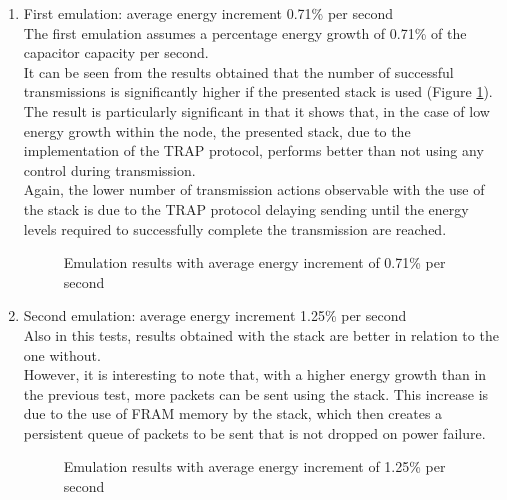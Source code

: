 \begin{enumerate}
\item First emulation: average energy increment 0.71\% per second\\
The first emulation assumes a percentage energy growth of 0.71\% of the capacitor capacity per second.\\
It can be seen from the results obtained that the number of successful transmissions is significantly higher if the presented stack is used (Figure \ref{fig:SGFT0}).\\
The result is particularly significant in that it shows that, in the case of low energy growth within the node, the presented stack, due to the implementation of the TRAP protocol, performs better than not using any control during transmission.\\
Again, the lower number of transmission actions observable with the use of the stack is due to the TRAP protocol delaying sending until the energy levels required to successfully complete the transmission are reached.
\begin{figure}[H]
\centerline{}
\caption{\footnotesize \centering Emulation results with average energy increment of 0.71\% per second}
\label{fig:SGFT0}
\end{figure}
\begin{comment}
\begin{figure}[H]
\centerline{\psfig{file=Images/7560071RATIO.png,width=0.7\textwidth}}
\caption{\footnotesize \centering Success ratio of transmission with average energy increment of 0.71\% per second}
\label{fig:SGFT1}
\end{figure}
\end{comment}
\item Second emulation: average energy increment 1.25\% per second\\
Also in this tests, results obtained with the stack are better in relation to the one without.\\
However, it is interesting to note that, with a higher energy growth than in the previous test, more packets can be sent using the stack. This increase is due to the use of FRAM memory by the stack, which then creates a persistent queue of packets to be sent that is not dropped on power failure.
\begin{figure}[H]
\centerline{}
\caption{\footnotesize \centering Emulation results with average energy increment of 1.25\% per second}

\end{figure}
\end{enumerate}
